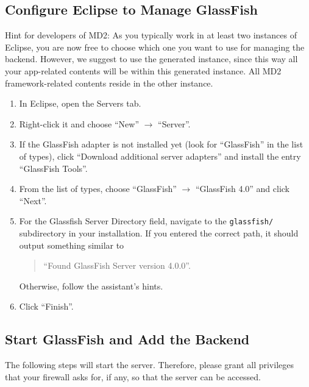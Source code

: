
\subsection{Configure Eclipse to Manage GlassFish}

Hint for developers of MD2:
As you typically work in at least two instances of Eclipse, you are now free to choose which one you want to use for managing the backend.
However, we suggest to use the generated instance, since this way all your app-related contents will be within this generated instance.
All MD2 framework-related contents reside in the other instance.

\begin{enumerate}
\item In Eclipse, open the Servers tab.
\item Right-click it and choose \enquote{New} $\rightarrow$ \enquote{Server}.
\item If the GlassFish adapter is not installed yet (look for \enquote{GlassFish} in the list of types), click \enquote{Download additional server adapters} and install the entry \enquote{GlassFish Tools}.
\item From the list of types, choose \enquote{GlassFish} $\rightarrow$ \enquote{GlassFish 4.0} and click \enquote{Next}.
\item For the Glassfish Server Directory field, navigate to the \texttt{glassfish/} subdirectory in your installation. If you entered the correct path, it should output something similar to
	\begin{quotation}
	\enquote{Found GlassFish Server version 4.0.0}.
	\end{quotation}
	Otherwise, follow the assistant's hints.
\item Click \enquote{Finish}.

\end{enumerate}

\subsection{Start GlassFish and Add the Backend}

The following steps will start the server.
Therefore, please grant all privileges that your firewall asks for, if any, so that the server can be accessed.

